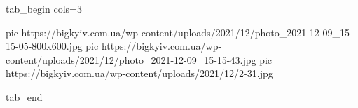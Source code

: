  
 
 
 
 
\ifcmt
  tab_begin cols=3

     pic https://bigkyiv.com.ua/wp-content/uploads/2021/12/photo_2021-12-09_15-15-05-800x600.jpg
     pic https://bigkyiv.com.ua/wp-content/uploads/2021/12/photo_2021-12-09_15-15-43.jpg
		 pic https://bigkyiv.com.ua/wp-content/uploads/2021/12/2-31.jpg

  tab_end
\fi
